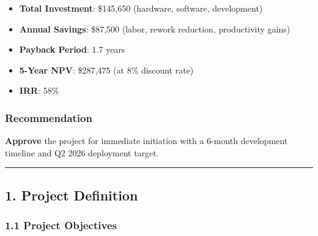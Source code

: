 \documentclass[
]{article}
\providecommand{\tightlist}{%
  \setlength{\itemsep}{0pt}\setlength{\parskip}{0pt}}
\begin{document}
\begin{itemize}
\tightlist
\item
  \textbf{Total Investment}: \$145,650 (hardware, software, development)
\item
  \textbf{Annual Savings}: \$87,500 (labor, rework reduction,
  productivity gains)
\item
  \textbf{Payback Period}: 1.7 years
\item
  \textbf{5-Year NPV}: \$287,475 (at 8\% discount rate)
\item
  \textbf{IRR}: 58\%
\end{itemize}

\hypertarget{recommendation}{%
\subsubsection{Recommendation}\label{recommendation}}

\textbf{Approve} the project for immediate initiation with a 6-month
development timeline and Q2 2026 deployment target.

\begin{center}\rule{0.5\linewidth}{0.5pt}\end{center}

\hypertarget{project-definition}{%
\subsection{1. Project Definition}\label{project-definition}}

\hypertarget{project-objectives}{%
\subsubsection{1.1 Project Objectives}\label{project-objectives}}
\end{document}
